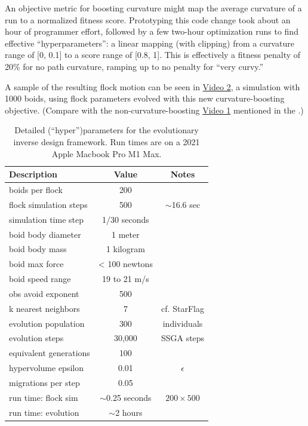 \documentclass[letterpaper]{article}
\begin{document}
An objective metric for boosting curvature might map the average curvature of a run to a normalized fitness score. Prototyping this code change took about an hour of programmer effort, followed by a few two-hour optimization runs to find effective ``hyperparameters'': a linear mapping (with clipping) from a curvature range of [0, 0.1] to a score range of [0.8, 1]. This is effectively a fitness penalty of 20\% for no path curvature, ramping up to no penalty for ``very curvy.'' 

A sample of the resulting flock motion can be seen in \href{https://drive.google.com/file/d/1HOeCqkmY__SiON4TCAQyPKa3CviIlPgM/view?usp=sharing}{Video 2}, a simulation with 1000 boids, using flock parameters evolved with this new curvature-boosting objective. (Compare with the non-curvature-boosting \href{https://drive.google.com/file/d/1ZbanvWVfapnH2TpTqamypWFoXuMeoY9b/view?usp=sharing}{Video 1} mentioned in the .)


\begin{table}[]
\centering
\begin{tabular}{ | l | c | c | }
    \hline
    \textbf{Description} & \textbf{Value} & \textbf{Notes} \\
    \hline
    boids per flock & 200 &  \\
    flock simulation steps & 500 & $\sim$16.6 sec \\
    simulation time step & 1/30 seconds & \\
    \hline
    boid body diameter & 1 meter & \\
    boid body mass & 1 kilogram & \\
    boid max force & < 100 newtons & \\
    boid speed range & 19 to 21 m/s & \\
    obs avoid exponent & 500 & \\
    k nearest neighbors & 7 & cf. StarFlag \\
    \hline
    evolution population & 300 & individuals \\
    evolution steps & 30,000 &  SSGA steps \\
    equivalent generations & 100 & \\
    hypervolume epsilon & 0.01 & $\epsilon$ \\
    migrations per step & 0.05 &  \\
    \hline
    run time: flock sim & $\sim$0.25 seconds & $200{\times}500$ \\
    run time: evolution & $\sim$2 hours & \\
    \hline
\end{tabular}
\caption{Detailed (``hyper'')parameters for the evolutionary inverse design framework. Run times are on a 2021 Apple Macbook Pro M1 Max.}
\label{table:HyperParameters}
\end{table}
\end{document}
